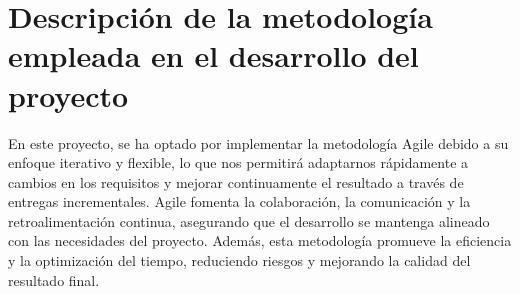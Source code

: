 \newpage

\section{Descripción de la metodología empleada en el desarrollo del proyecto}

En este proyecto, se ha optado por implementar la metodología Agile debido a su enfoque iterativo y flexible, lo que nos permitirá adaptarnos rápidamente a cambios en los requisitos y mejorar continuamente el resultado a través de entregas incrementales. 
Agile fomenta la colaboración, la comunicación y la retroalimentación continua, asegurando que el desarrollo se mantenga alineado con las necesidades del proyecto. 
Además, esta metodología promueve la eficiencia y la optimización del tiempo, reduciendo riesgos y mejorando la calidad del resultado final.

